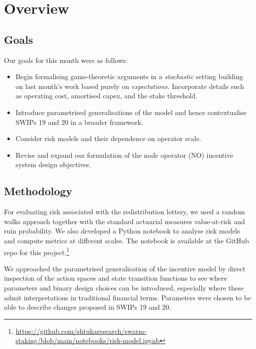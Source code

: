 \maketitle
\section*{Overview}

\subsection*{Goals}

Our goals for this month were as follows: 

\begin{itemize}
  \item 
    Begin formalising game-theoretic arguments in a {\em stochastic} setting building on last month's work based purely on {\em expectations.}
    Incorporate details such as operating cost, amortised capex, and the stake threshold.
  \item
    Introduce parametrised generalisations of the model and hence contextualise SWIPs 19 and 20 in a broader framework.
  \item 
    Consider risk models and their dependence on operator scale.
  \item
    Revise and expand our formulation of the node operator (NO) incentive system design objectives.
\end{itemize}

\subsection*{Methodology}

For evaluating risk associated with the redistribution lottery, we used a random walks approach together with the standard actuarial measures value-at-risk and ruin probability.
%
We also developed a Python notebook to analyse risk models and compute metrics at different scales. The notebook is available at the GitHub repo for this project.\footnote{\url{https://github.com/shtukaresearch/swarm-staking/blob/main/notebooks/risk-model.ipynb}}

We approached the parametrised generalisation of the incentive model by direct inspection of the action spaces and state transition functions to see where parameters and binary design choices can be introduced, especially where these admit interpretations in traditional financial terms. 
%
Parameters were chosen to be able to describe changes proposed in SWIPs 19 and 20.


